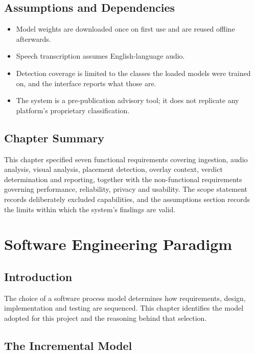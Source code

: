 \documentclass[12pt,a4paper,twoside]{report}
\begin{document}
\section{Assumptions and Dependencies}

\begin{itemize}
\item Model weights are downloaded once on first use and are reused offline afterwards.
\item Speech transcription assumes English-language audio.
\item Detection coverage is limited to the classes the loaded models were trained on, and the interface reports what those are.
\item The system is a pre-publication advisory tool; it does not replicate any platform's proprietary classification.
\end{itemize}

\section{Chapter Summary}

This chapter specified seven functional requirements covering ingestion, audio analysis, visual analysis, placement detection, overlay context, verdict determination and reporting, together with the non-functional requirements governing performance, reliability, privacy and usability. The scope statement records deliberately excluded capabilities, and the assumptions section records the limits within which the system's findings are valid.

\chapter{Software Engineering Paradigm}

\section{Introduction}

The choice of a software process model determines how requirements, design, implementation and testing are sequenced. This chapter identifies the model adopted for this project and the reasoning behind that selection.

\section{The Incremental Model}
\end{document}

